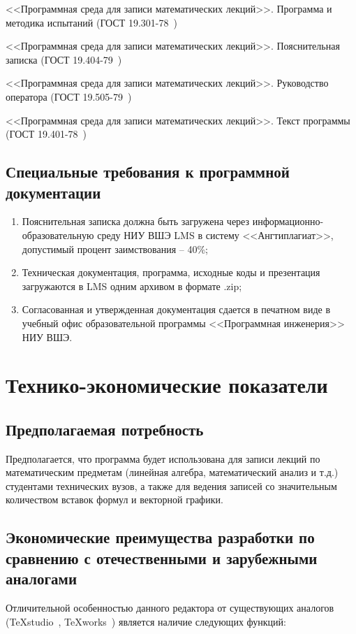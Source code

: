 \documentclass[techtask]{espd}
\begin{document}
<<Программная среда для записи математических лекций>>. Программа и методика испытаний (ГОСТ 19.301-78~\cite{espd301})

<<Программная среда для записи математических лекций>>. Пояснительная записка (ГОСТ 19.404-79~\cite{espd404})

<<Программная среда для записи математических лекций>>. Руководство оператора (ГОСТ 19.505-79~\cite{espd505})

<<Программная среда для записи математических лекций>>. Текст программы (ГОСТ 19.401-78~\cite{espd401})

\subsection{Специальные требования к программной документации}
\begin{enumerate}
\item Пояснительная записка должна быть загружена через информационно-образовательную среду НИУ ВШЭ LMS в систему <<Ангтиплагиат>>, допустимый процент заимствования -- 40\%;
\item Техническая документация, программа, исходные коды и презентация загружаются в LMS одним архивом в формате .zip;
\item Согласованная и утвержденная документация сдается в печатном виде в учебный офис образовательной программы <<Программная инженерия>> НИУ ВШЭ.
\end{enumerate}

\section{Технико-экономические показатели}
\subsection{Предполагаемая потребность}
Предполагается, что программа будет использована для записи лекций по математическим предметам (линейная алгебра, математический анализ и т.д.) студентами технических вузов, а также для ведения записей со значительным количеством вставок формул и векторной графики.

\subsection{Экономические преимущества разработки по сравнению с отечественными и зарубежными аналогами}
Отличительной особенностью данного редактора от существующих аналогов (TeXstudio~\cite{texstudio}, TeXworks~\cite{texworks}) является наличие следующих функций:
\end{document}
